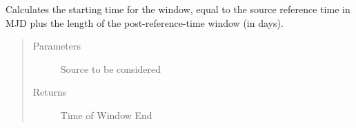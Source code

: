 \documentclass[letterpaper,10pt,english]{sphinxmanual}
\begin{document}
\begin{fulllineitems}
\begin{fulllineitems}
\label{\detokenize{index:flarestack.core.time_pdf.FixedRefBox.sig_t1}}
Calculates the starting time for the window, equal to the
source reference time in MJD plus the length of the post-reference-time
window (in days).
\begin{quote}\begin{description}
\item[{Parameters}] \leavevmode
{} \textendash{} Source to be considered

\item[{Returns}] \leavevmode
Time of Window End

\end{description}\end{quote}

\end{fulllineitems}


\end{fulllineitems}

\end{document}
